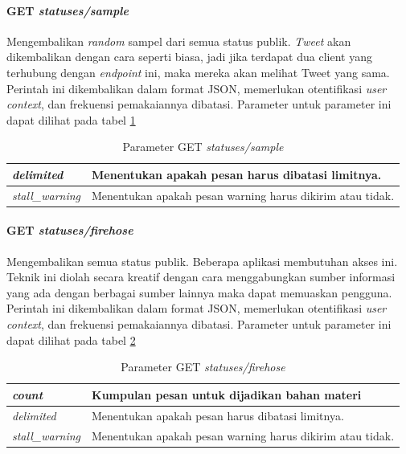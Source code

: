 \paragraph{GET \textit{statuses/sample}}
Mengembalikan \textit{random} sampel dari semua status publik. \textit{Tweet} akan dikembalikan dengan cara seperti biasa, jadi jika terdapat dua client yang terhubung dengan \textit{endpoint} ini, maka mereka akan melihat Tweet yang sama. Perintah ini dikembalikan dalam format JSON, memerlukan otentifikasi \textit{user context}, dan frekuensi pemakaiannya dibatasi. Parameter untuk parameter ini dapat dilihat pada tabel \ref{table:ParameterGetStatusesSample}

\begin{table}[h]
\begin{tabular}{|l|l|}
\hline
\textit{delimited}          & Menentukan apakah pesan harus dibatasi limitnya. \\ \hline
\textit{stall\_warning}           & Menentukan apakah pesan warning harus dikirim atau tidak.                \\   \hline          
\end{tabular}
\caption{Parameter GET \textit{statuses/sample}}
\label{table:ParameterGetStatusesSample}
\end{table}


\paragraph{GET \textit{statuses/firehose}}
Mengembalikan semua status publik. Beberapa aplikasi membutuhan akses ini. Teknik ini diolah secara kreatif dengan cara menggabungkan sumber informasi yang ada dengan berbagai sumber lainnya maka dapat memuaskan pengguna. Perintah ini dikembalikan dalam format JSON, memerlukan otentifikasi \textit{user context}, dan frekuensi pemakaiannya dibatasi. Parameter untuk parameter ini dapat dilihat pada tabel \ref{table:ParameterGetStatusesFirehose}


\begin{table}[h]
\begin{tabular}{|l|l|}
\hline
\textit{count} & Kumpulan pesan untuk dijadikan bahan materi \\ \hline
\textit{delimited}          & Menentukan apakah pesan harus dibatasi limitnya. \\ \hline
\textit{stall\_warning}           & Menentukan apakah pesan warning harus dikirim atau tidak.                \\     \hline        
\end{tabular}
\caption{Parameter GET \textit{statuses/firehose}}
\label{table:ParameterGetStatusesFirehose}
\end{table}


